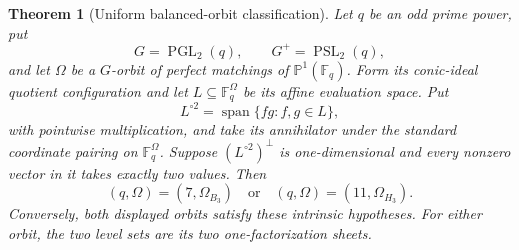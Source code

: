 \documentclass[11pt]{article}
\newtheorem{theorem}{Theorem}[section]
\theoremstyle{definition}
\theoremstyle{remark}
\newcommand{\F}{\mathbb{F}}
\begin{document}
\begin{theorem}[Uniform balanced-orbit classification]
\label{thm:balanced-orbit-completeness}
Let \(q\) be an odd prime power, put
\[
 G=\operatorname{PGL}_2(q),\qquad G^+=\operatorname{PSL}_2(q),
\]
and let \(\Omega\) be a \(G\)-orbit of perfect matchings of
\(\mathbb P^1(\F_q)\).  Form its conic-ideal quotient configuration and
let \(L\subseteq\F_q^\Omega\) be its affine evaluation space.  Put
\[
 L^{\circ2}=\operatorname{span}\{fg:f,g\in L\},
\]
with pointwise multiplication, and take its annihilator under the
standard coordinate pairing on \(\F_q^\Omega\).  Suppose
\((L^{\circ2})^\perp\) is one-dimensional and every nonzero vector in it
takes exactly two values.  Then
\[
 (q,\Omega)=(7,\Omega_{B_3})
 \quad\text{or}\quad
 (q,\Omega)=(11,\Omega_{H_3}).
                                                        \tag{3.2h}
\]
Conversely, both displayed orbits satisfy these intrinsic hypotheses.
For either orbit, the two level sets are its two one-factorization sheets.
\end{theorem}
\end{document}
